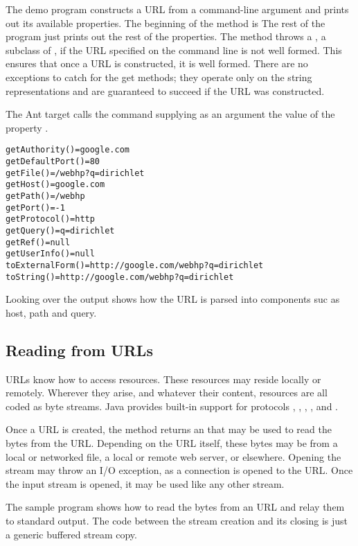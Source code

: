 The demo program  constructs a URL from a
command-line argument and prints out its available properties.  The
beginning of the  method is
%
%
The rest of the program just prints out the rest of the properties.
The  method throws a , a
subclass of , if the URL specified on the command
line is not well formed.  This ensures that once a URL is constructed,
it is well formed.  There are no exceptions to catch for the get
methods; they operate only on the string representations and are
guaranteed to succeed if the URL was constructed.

The Ant target  calls the command supplying as
an argument the value of the property .
%
\begin{verbatim}
getAuthority()=google.com
getDefaultPort()=80
getFile()=/webhp?q=dirichlet
getHost()=google.com
getPath()=/webhp
getPort()=-1
getProtocol()=http
getQuery()=q=dirichlet
getRef()=null
getUserInfo()=null
toExternalForm()=http://google.com/webhp?q=dirichlet
toString()=http://google.com/webhp?q=dirichlet
\end{verbatim}
%
Looking over the output shows how the URL is parsed into components
suc as host, path and query.

\subsection{Reading from URLs}

URLs know how to access resources.  These resources may reside locally
or remotely.  Wherever they arise, and whatever their content, 
resources are all coded as byte streams.  Java provides built-in support
for protocols , , , , and 
.  

Once a URL is created, the method  returns an
 that may be used to read the bytes from the URL.
Depending on the URL itself, these bytes may be from a local or
networked file, a local or remote web server, or elsewhere.  Opening
the stream may throw an I/O exception, as a connection is opened to
the URL.  Once the input stream is opened, it may be used like
any other stream.  

The sample program  shows how to read the
bytes from an URL and relay them to standard output.
%
%
The code between the stream creation and its closing is just a generic
buffered stream copy.  

